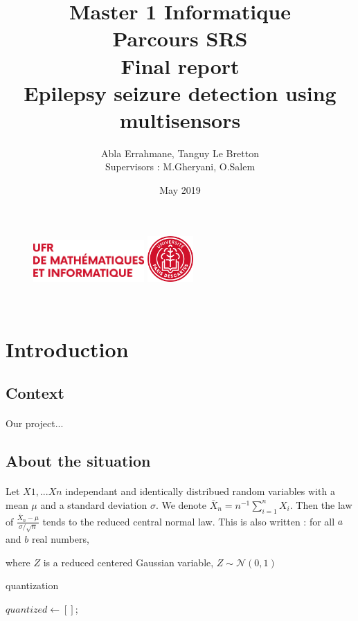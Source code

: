 \documentclass[11pt]{article}
\title{	\LARGE Master 1 Informatique \\
	Parcours SRS \\ 
	\vspace{20mm} 
\Huge	\textbf{Final report} \\ 
	\vspace{20mm} 
\Huge	\textbf{Epilepsy seizure detection using multisensors}
}
\author{Abla Errahmane, Tanguy Le Bretton \\ \vspace{5mm} Supervisors : M.Gheryani, O.Salem}
\date{May 2019}
\begin{document}
\begin{figure}[t]
	\includegraphics[width=120pt]{MI_logo.png}
	\includegraphics[width=50pt]{Descartes_logo.png}

\end{figure}

\maketitle

\newpage
~
\newpage
\tableofcontents
\newpage


\section{Introduction}
\subsection{Context}
\paragraph{}
Our project...

\subsection{About the situation}
\paragraph{}

Let $X1,...Xn$ independant and identically distribued random variables with a mean $\mu$ and a standard deviation $\sigma$. We denote $\bar{X}_n = n^{-1} \sum_{i=1}^{n}X_i$. Then the law of $\frac{\bar{X}_n- \mu}{\sigma / \sqrt{n}}$ tends to the reduced central normal law. This is also written : 
for all $a$ and $b$ real numbers, \newline

where $Z$ is a reduced centered Gaussian variable, $Z\sim \mathcal{N}(0,1)$

\begin{algorithm}
\SetAlgoLined
\DontPrintSemicolon
{}
\caption{quantization}
$quantized \gets []$;\;
\end{algorithm}
\end{document}
